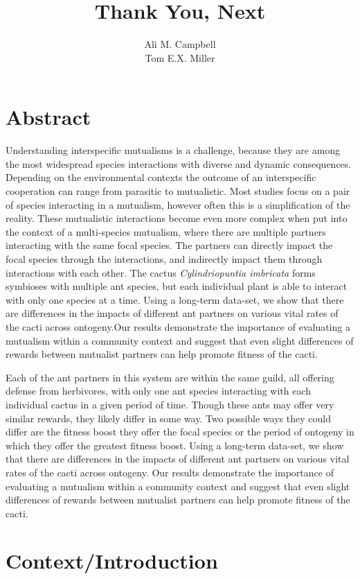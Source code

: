 \documentclass[12pt,a4paper]{article}
\title{Thank You, Next}
\author{Ali M. Campbell\\
	Tom E.X. Miller}
\begin{document}
	\maketitle
	
	\section*{Abstract}

Understanding interspecific mutualisms is a challenge, because they are among the most widespread species interactions with diverse and dynamic consequences. Depending on the environmental contexts the outcome of an interspecific cooperation can range from parasitic to mutualistic. Most studies focus on a pair of species interacting in a mutualism, however often this is a simplification of the reality. These mutualistic interactions become even more complex when put into the context of a multi-species mutualism, where there are multiple partners interacting with the same focal species. The partners can directly impact the focal species through the interactions, and indirectly impact them through interactions with each other. The cactus \textit{Cylindriopuntia imbricata} forms symbioses with multiple ant species, but each individual plant is able to interact with only one species at a time. Using a long-term data-set, we show that there are differences in the impacts of different ant partners on various vital rates of the cacti across ontogeny.Our results demonstrate the importance of evaluating a mutualism within a community context and suggest that even slight differences of rewards between mutualist partners can help promote fitness of the cacti. 

Each of the ant partners in this system are within the same guild, all offering defense from herbivores, with only one ant species interacting with each individual cactus in a given period of time. Though these ants may offer very similar rewards, they likely differ in some way. Two possible ways they could differ are the fitness boost they offer the focal species or the period of ontogeny in which they offer the greatest fitness boost. Using a long-term data-set, we show that there are differences in the impacts of different ant partners on various vital rates of the cacti across ontogeny. Our results demonstrate the importance of evaluating a mutualism within a community context and suggest that even slight differences of rewards between mutualist partners can help promote fitness of the cacti. 

\section*{Context/Introduction}
\end{document}
